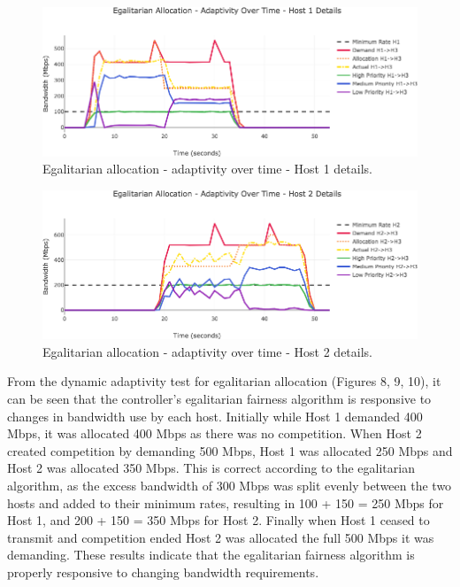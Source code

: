 \documentclass[accepted,single]{gipaper}
\begin{document}
\begin{figure}
	\centering
	\includegraphics[width=6in]{figs/dbae_ot_udp_h1.png}
	\caption{ Egalitarian allocation - adaptivity over time - Host 1 details. } \label{dpae_ot_h1}
\end{figure}

\begin{figure}
	\centering
	\includegraphics[width=6in]{figs/dbae_ot_udp_h2.png}
	\caption{ Egalitarian allocation - adaptivity over time - Host 2 details. } \label{dbae_ot_h2}
\end{figure}

From the dynamic adaptivity test for egalitarian allocation (Figures 8, 9, 10), it can be seen that the controller's egalitarian fairness algorithm is responsive to changes in bandwidth use by each host. Initially while Host 1 demanded 400 Mbps, it was allocated 400 Mbps as there was no competition. When Host 2 created competition by demanding 500 Mbps, Host 1 was allocated 250 Mbps and Host 2 was allocated 350 Mbps. This is correct according to the egalitarian algorithm, as the excess bandwidth of 300 Mbps was split evenly between the two hosts and added to their minimum rates, resulting in 100 + 150 = 250 Mbps for Host 1, and 200 + 150 = 350 Mbps for Host 2. Finally when Host 1 ceased to transmit and competition ended Host 2 was allocated the full 500 Mbps it was demanding. These results indicate that the egalitarian fairness algorithm is properly responsive to changing bandwidth requirements.
\end{document}
